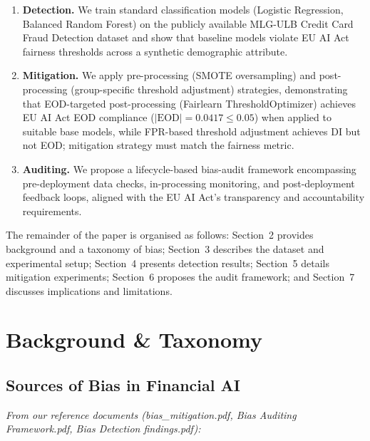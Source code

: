\documentclass[conference]{IEEEtran}
\begin{document}
\begin{enumerate}
\item \textbf{Detection.}  We train standard classification models (Logistic
   Regression, Balanced Random Forest) on the publicly available
   MLG-ULB Credit Card Fraud Detection dataset and show that baseline
   models violate EU AI Act fairness thresholds across a synthetic
   demographic attribute.
\item \textbf{Mitigation.}  We apply pre-processing (SMOTE oversampling) and
   post-processing (group-specific threshold adjustment) strategies,
   demonstrating that EOD-targeted post-processing (Fairlearn ThresholdOptimizer) achieves EU AI Act EOD compliance ($|\mathrm{EOD}| = 0.0417 \leq 0.05$) when applied to suitable base models, while FPR-based threshold adjustment achieves DI but not EOD; mitigation strategy must match the fairness metric.
\item \textbf{Auditing.}  We propose a lifecycle-based bias-audit framework
   encompassing pre-deployment data checks, in-processing monitoring,
   and post-deployment feedback loops, aligned with the EU AI Act's
   transparency and accountability requirements.
\end{enumerate}

The remainder of the paper is organised as follows: Section~2 provides background and a taxonomy of bias; Section~3 describes the dataset and experimental setup; Section~4 presents detection results; Section~5 details mitigation experiments; Section~6 proposes the audit framework; and Section~7 discusses implications and limitations.

\section{Background \& Taxonomy}
\label{sec:background}

\subsection{Sources of Bias in Financial AI}

\textit{From our reference documents (bias\_mitigation.pdf, Bias Auditing Framework.pdf, Bias Detection findings.pdf):}
\end{document}
